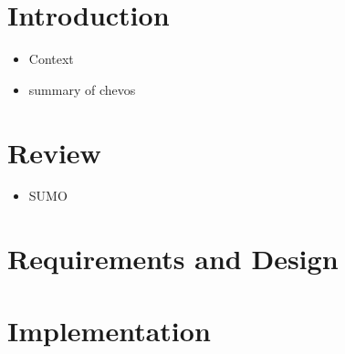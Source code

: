 

\section{Introduction}

\begin{itemize}
	\item Context
	\item summary of chevos
\end{itemize}

\section{Review}

\begin{itemize}
    \item SUMO
\end{itemize}

\section{Requirements and Design}


\section{Implementation}

